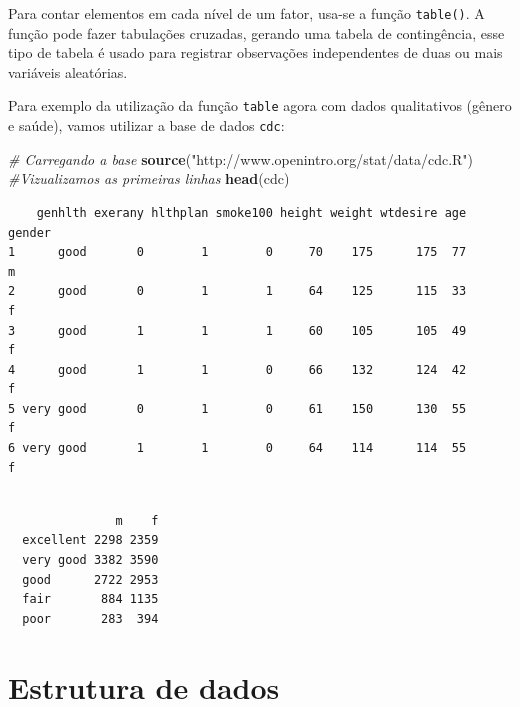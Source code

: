 \documentclass[12pt,portuguese,oneside]{book}
\newenvironment{Shaded}{\begin{snugshade}}{\end{snugshade}}
\newcommand{\KeywordTok}[1]{\textcolor[rgb]{0.13,0.29,0.53}{\textbf{#1}}}
\newcommand{\StringTok}[1]{\textcolor[rgb]{0.31,0.60,0.02}{#1}}
\newcommand{\CommentTok}[1]{\textcolor[rgb]{0.56,0.35,0.01}{\textit{#1}}}
\newcommand{\OperatorTok}[1]{\textcolor[rgb]{0.81,0.36,0.00}{\textbf{#1}}}
\newcommand{\NormalTok}[1]{#1}
\begin{document}
Para contar elementos em cada nível de um fator, usa-se a função
\texttt{table()}. A função pode fazer tabulações cruzadas, gerando uma
tabela de contingência, esse tipo de tabela é usado para registrar
observações independentes de duas ou mais variáveis aleatórias.

Para exemplo da utilização da função \texttt{table} agora com dados
qualitativos (gênero e saúde), vamos utilizar a base de dados
\texttt{cdc}:

\begin{Shaded}
\begin{Highlighting}[]
\CommentTok{# Carregando a base}
\KeywordTok{source}\NormalTok{(}\StringTok{"http://www.openintro.org/stat/data/cdc.R"}\NormalTok{)}
\CommentTok{#Vizualizamos as primeiras linhas}
\KeywordTok{head}\NormalTok{(cdc)}
\end{Highlighting}
\end{Shaded}

\begin{verbatim}
    genhlth exerany hlthplan smoke100 height weight wtdesire age gender
1      good       0        1        0     70    175      175  77      m
2      good       0        1        1     64    125      115  33      f
3      good       1        1        1     60    105      105  49      f
4      good       1        1        0     66    132      124  42      f
5 very good       0        1        0     61    150      130  55      f
6 very good       1        1        0     64    114      114  55      f
\end{verbatim}

\begin{Shaded}
\end{Shaded}

\begin{verbatim}
           
               m    f
  excellent 2298 2359
  very good 3382 3590
  good      2722 2953
  fair       884 1135
  poor       283  394
\end{verbatim}

\section{Estrutura de dados}\label{estrutura-de-dados}
\end{document}
